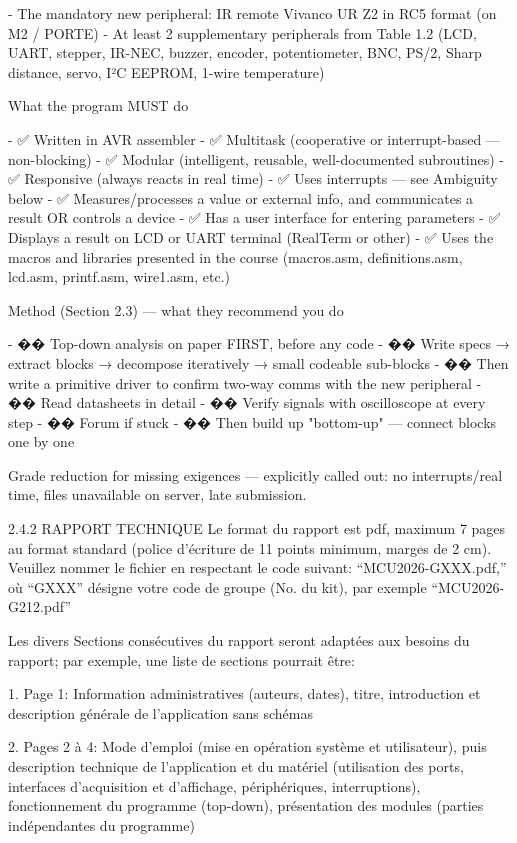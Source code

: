 \documentclass[11pt]{article}
\begin{document}
   - The mandatory new peripheral: IR remote Vivanco UR
   Z2 in RC5 format (on M2 / PORTE)
  - At least 2 supplementary peripherals from Table
  1.2 (LCD, UART, stepper, IR-NEC, buzzer, encoder,
  potentiometer, BNC, PS/2, Sharp distance, servo, I²C
   EEPROM, 1-wire temperature)


    What the program MUST do

  - ✅ Written in AVR assembler
  - ✅ Multitask (cooperative or interrupt-based —
  non-blocking)
  - ✅ Modular (intelligent, reusable, well-documented
   subroutines)
  - ✅ Responsive (always reacts in real time)
  - ✅ Uses interrupts — see Ambiguity below
  - ✅ Measures/processes a value or external info,
  and communicates a result OR controls a device
  - ✅ Has a user interface for entering parameters
  - ✅ Displays a result on LCD or UART terminal
  (RealTerm or other)
  - ✅ Uses the macros and libraries presented in the
  course (macros.asm, definitions.asm, lcd.asm,
  printf.asm, wire1.asm, etc.)

  Method (Section 2.3) — what they recommend you do

  - �� Top-down analysis on paper FIRST, before any
  code
  - �� Write specs → extract blocks → decompose
  iteratively → small codeable sub-blocks
  - �� Then write a primitive driver to confirm
  two-way comms with the new peripheral
  - �� Read datasheets in detail
  - �� Verify signals with oscilloscope at every step
  - �� Forum if stuck
  - �� Then build up "bottom-up" — connect blocks one
  by one

  
  Grade reduction for missing exigences — explicitly
  called out: no interrupts/real time, files
  unavailable on server, late submission.

2.4.2 RAPPORT TECHNIQUE
Le format du rapport est pdf, maximum 7 pages au format standard (police d’écriture de 11 points minimum,
marges de 2 cm). Veuillez nommer le fichier en respectant le code suivant: “MCU2026-GXXX.pdf,” où
“GXXX” désigne votre code de groupe (No. du kit), par exemple “MCU2026-G212.pdf”

Les divers Sections consécutives du rapport seront adaptées aux besoins du rapport; par exemple, une liste
de sections pourrait être:

1. Page 1: Information administratives (auteurs, dates), titre, introduction et description générale de
l’application sans schémas

2. Pages 2 à 4: Mode d’emploi (mise en opération système et utilisateur), puis description technique de
l’application et du matériel (utilisation des ports, interfaces d’acquisition et d’affichage,
périphériques, interruptions), fonctionnement du programme (top-down), présentation des modules
(parties indépendantes du programme)
\end{document}
